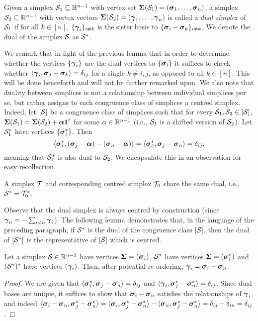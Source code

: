 \begin{definition}
\label{def:dual_simplex}
Given a simplex $\mathcal{S}_1\subseteq\mathbb{R}^{n-1}$ with vertex set $\boldsymbol{\Sigma}(\mathcal{S}_1)=(\vb*{\sigma}_1,\dots,\vb*{\sigma}_n)$, a simplex $\mathcal{S}_2\subseteq \mathbb{R}^{n-1}$ with vertex vectors $\boldsymbol{\Sigma}(\mathcal{S}_2)=(\vb*{\gamma}_1,\dots,\vb*{\gamma}_n)$ is called a \emph{dual simplex} of $\mathcal{S}_1$ if for all $k\in[n]$, $\{\vb*{\gamma}_i\}_{i\neq k}$ is the sister basis to $\{\vb*{\sigma}_i-\vb*{\sigma}_k\}_{i\neq k}$. We denote the dual of the simplex $\mathcal{S}$ as $\mathcal{S}^*$. 
\end{definition}

We remark that in light of the previous lemma that in order to determine whether the vertices $\{\vb*{\gamma}_i\}$ are the dual vertices to $\{\vb*{\sigma}_i\}$ it suffices to check whether $\langle \vb*{\gamma}_i,\vb*{\sigma}_j-\vb*{\sigma}_k\rangle=\delta_{ij}$ for a single $k\neq i,j$, as opposed to all $k\in[n]$. This will be done henceforth and will not be further remarked upon. 
We also note that duality between simplices is not a relationship between individual simplices per se, but rather assigns to each congruence class of simplices a centred simplex. Indeed, let $[\mathcal{S}]$ be a congruence class of simplices such that for every $\mathcal{S}_1,\mathcal{S}_2\in[\mathcal{S}]$, $\boldsymbol{\Sigma}(\mathcal{S}_1) = \boldsymbol{\Sigma}(\mathcal{S}_2) + \vb*{\alpha}\vb{1}^t$ for some $\alpha\in\mathbb{R}^{n-1}$ (i.e., $\mathcal{S}_1$ is a shifted version of $\mathcal{S}_2$). Let $\mathcal{S}_1^*$ have vertices $\{\vb*{\sigma}_i^*\}$. Then
\[\langle \vb*{\sigma}_i^*,(\vb*{\sigma}_j-\vb*{\alpha}) - (\vb*{\sigma}_n-\vb*{\alpha})\rangle = \langle \vb*{\sigma}_i^*,\vb*{\sigma}_j-\vb*{\sigma}_n\rangle=\delta_{ij}, \]
meaning that $\mathcal{S}_1^*$ is also dual to $\mathcal{S}_2$. We encapsulate this in an observation for easy recollection. 

\begin{observation}
	\label{obs:dual_centred}
	A simplex $\mathcal{T}$ and corresponding centred simplex $\mathcal{T}_0$ share the same dual, i.e., $\mathcal{S}^* = \mathcal{T}_0^*$. 
\end{observation}


Observe that the dual simplex is always centred by construction (since $\vb*{\gamma}_n=-\sum_{i<n}\vb*{\gamma}_i$).  The following lemma demonstrates that, in the language of the preceding paragraph, if $\mathcal{S}^*$ is the dual of the congruence class $[\mathcal{S}]$, then the dual of $[\mathcal{S}^*]$ is the representative of $[\mathcal{S}]$ which is centred. 

\begin{lemma}
	\label{lem:dual_of_dual}
	Let a simplex $\mathcal{S}\in\mathbb{R}^{n-1}$ have vertices $\boldsymbol{\Sigma}=(\vb*{\sigma}_i)$, $\mathcal{S}^*$ have vertices $\boldsymbol{\Sigma}=(\vb*{\sigma}_i^*)$ and $(\mathcal{S}^*)^*$ have vertices $(\vb*{\gamma}_i)$. Then, after potential re-ordering, $\vb*{\gamma}_i = \vb*{\sigma}_i-\vb*{\sigma}_n$. 
\end{lemma}
\begin{proof}
	We are given that $\langle \vb*{\sigma}_i^*,\vb*{\sigma}_j-\vb*{\sigma}_n\rangle=\delta_{ij}$ and $\langle \vb*{\gamma}_i,\vb*{\sigma}_j^*-\vb*{\sigma}_n^*\rangle=\delta_{ij}$. Since dual bases are unique, it suffices to show that $\vb*{\sigma}_i-\vb*{\sigma}_n$ satisfies the relationships of $\vb*{\gamma}_i$, and indeed $\langle \vb*{\sigma}_i-\vb*{\sigma}_n,\vb*{\sigma}_j^*-\vb*{\sigma}_n^*\rangle = \langle \vb*{\sigma}_i,\vb*{\sigma}_j^*-\vb*{\sigma}_n^*\rangle - \langle \vb*{\sigma}_n,\vb*{\sigma}_j^*-\vb*{\sigma}_n^*\rangle = \delta_{ij} - \delta_{in} = \delta_{ij}$. 
\end{proof} 

